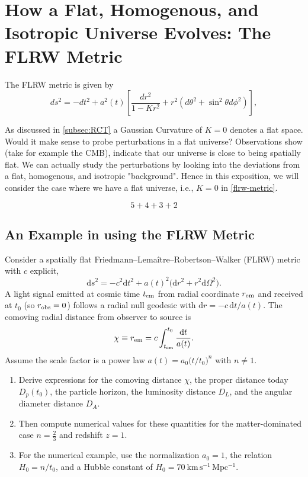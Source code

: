 \documentclass[a4paper,11pt]{article}
\begin{document}
\section{How a Flat, Homogenous, and Isotropic Universe Evolves: The FLRW Metric}


The FLRW metric is given by 
\begin{equation}
    ds^2 = -dt^2 + a^2(t) \left[ \frac{dr^2}{1-Kr^2} + r^2 (d\theta^2 + \sin^2 \theta d\phi^2) \right],
    \label{flrw-metric}
\end{equation}





As discussed in \ref{subsec:RCT} a Gaussian Curvature of $K=0$ denotes a flat space. Would it make sense
to probe perturbations in a flat universe? Observations show (take for example the CMB), indicate
that our universe is close to being spatially flat. We can actually study the perturbations by 
looking into the deviations from a flat, homogenous, and isotropic "background". Hence in this exposition,
we will consider the case where we have a flat universe, i.e., $K=0$ in \cref{flrw-metric}.


\begin{equation}
5+4+3+2
\label{eq:trial}
\end{equation}

\subsection{An Example in using the FLRW Metric}

Consider a spatially flat Friedmann–Lemaître–Robertson–Walker (FLRW) metric with $c$ explicit,
$$ \mathrm{d}s^2 = -c^2\mathrm{d}t^2 + a(t)^2\bigl(\mathrm{d}r^2 + r^2\mathrm{d}\Omega^2\bigr). $$
A light signal emitted at cosmic time $t_{\rm em}$ from radial coordinate $r_{\rm em}$ and received at $t_0$ (so $r_{\rm obs}=0$) follows a radial null geodesic with $\mathrm{d}r = -c\,\mathrm{d}t/a(t)$. The comoving radial distance from observer to source is
$$ \chi \equiv r_{\rm em} = c\int_{t_{\rm em}}^{t_0}\frac{\mathrm{d}t}{a(t)}. $$
Assume the scale factor is a power law $a(t)=a_0\bigl(t/t_0\bigr)^n$ with $n\neq 1$.

\vspace{1em} %
\begin{enumerate}
    \item Derive expressions for the comoving distance $\chi$, the proper distance today $D_{p}(t_0)$, the particle horizon, the luminosity distance $D_L$, and the angular diameter distance $D_A$.
    
    \item Then compute numerical values for these quantities for the matter-dominated case $n=\tfrac{2}{3}$ and redshift $z=1$.
    
    \item For the numerical example, use the normalization $a_0=1$, the relation $H_0=n/t_0$, and a Hubble constant of $H_0=70\ \mathrm{km\,s^{-1}\,Mpc^{-1}}$.
\end{enumerate}
\end{document}
